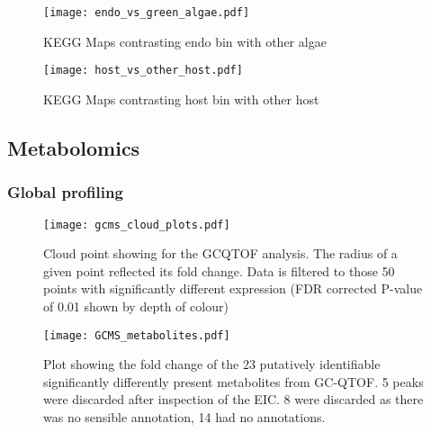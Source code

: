 \begin{figure}
    \texttt{[image: endo\_vs\_green\_algae.pdf]}
    \caption[KEGG Maps of Endosymbiont Bin Compared with Other Algae]{
    KEGG Maps contrasting endo bin with other algae}
\end{figure}

\begin{figure}
    \texttt{[image: host\_vs\_other\_host.pdf]}
    \caption[KEGG Maps of Host Bin Compared with Other \textit{Paramecium}]{
    KEGG Maps contrasting host bin with other host}
\end{figure}

\subsection{Metabolomics} 

\subsubsection{Global profiling}



\begin{figure}
    \centering
    \texttt{[image: gcms\_cloud\_plots.pdf]}
    \caption[GCQTOF Cloud Plot]{Cloud point showing for the GCQTOF analysis. 
    The radius of a given point reflected its fold change.
    Data is filtered to those 50 points with significantly 
different expression (FDR corrected P-value of 0.01 shown by 
depth of colour)}
    \label{fig:gcms_clouds}
\end{figure}


\begin{figure}
    \centering
    \texttt{[image: GCMS\_metabolites.pdf]}
    \caption[Plot of Identifiable GC-QTOF Metabolites]{Plot showing the
        fold change of the 23 putatively identifiable significantly
        differently present metabolites from GC-QTOF. 5 peaks
        were discarded after inspection of the EIC. 8 were discarded
    as there was no sensible annotation, 14 had no annotations.}
    \label{fig:gcms_metabolites}
\end{figure}



